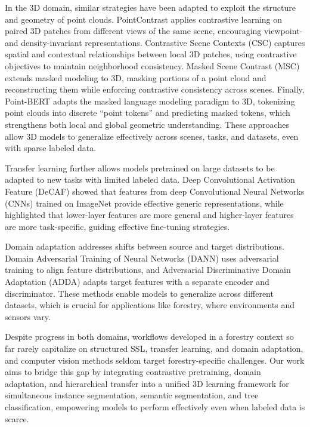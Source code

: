 \documentclass[review,authoryear]{elsarticle}
\begin{document}
In the 3D domain, similar strategies have been adapted to exploit the structure and geometry of point clouds. PointContrast \citep{xie2020pointcontrast} applies contrastive learning on paired 3D patches from different views of the same scene, encouraging viewpoint- and density-invariant representations. Contrastive Scene Contexts (CSC) \citep{hou2021contrastive} captures spatial and contextual relationships between local 3D patches, using contrastive objectives to maintain neighborhood consistency. Masked Scene Contrast (MSC) \citep{wu2023masked} extends masked modeling to 3D, masking portions of a point cloud and reconstructing them while enforcing contrastive consistency across scenes. Finally, Point-BERT \citep{yu2022pointbert} adapts the masked language modeling paradigm to 3D, tokenizing point clouds into discrete “point tokens” and predicting masked tokens, which strengthens both local and global geometric understanding. These approaches allow 3D models to generalize effectively across scenes, tasks, and datasets, even with sparse labeled data.

Transfer learning further allows models pretrained on large datasets to be adapted to new tasks with limited labeled data. Deep Convolutional Activation Feature (DeCAF) \citep{donahue2014decaf} showed that features from deep Convolutional Neural Networks (CNNs) trained on ImageNet provide effective generic representations, while \cite{yosinski2014transferable} highlighted that lower-layer features are more general and higher-layer features are more task-specific, guiding effective fine-tuning strategies.

Domain adaptation addresses shifts between source and target distributions. Domain Adversarial Training of Neural Networks (DANN) \citep{ganin2016domain} uses adversarial training to align feature distributions, and Adversarial Discriminative Domain Adaptation (ADDA) \citep{tzeng2017adversarial} adapts target features with a separate encoder and discriminator. These methods enable models to generalize across different datasets, which is crucial for applications like forestry, where environments and sensors vary.

Despite progress in both domains, workflows developed in a forestry context so far rarely capitalize on structured SSL, transfer learning, and domain adaptation, and computer vision methods seldom target forestry-specific challenges. Our work aims to bridge this gap by integrating contrastive pretraining, domain adaptation, and hierarchical transfer into a unified 3D learning framework for simultaneous instance segmentation, semantic segmentation, and tree classification, empowering models to perform effectively even when labeled data is scarce.
\end{document}
